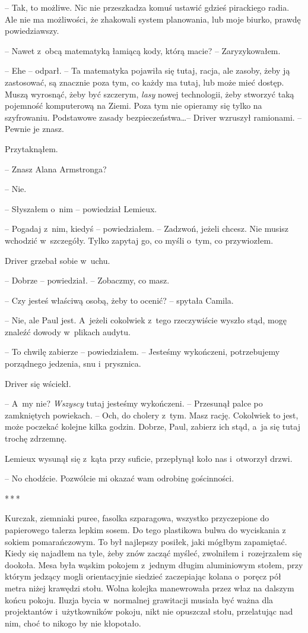 \documentclass[oneside,polish,12pt,sfheadings]{mwbk}
\newcommand{\threeast}{\bigskip\par\centerline{*\,*\,*}\medskip\par}%
\begin{document}
-- Tak, to możliwe. Nic nie przeszkadza
komuś ustawić gdzieś pirackiego radia. Ale nie ma możliwości, że
zhakowali system planowania, lub moje biurko, prawdę powiedziawszy.

-- Nawet z~obcą matematyką łamiącą kody, którą macie? -- Zaryzykowałem.

-- Ehe -- odparł. -- Ta matematyka pojawiła się tutaj, racja, ale zasoby,
żeby ją zastosować, są znacznie poza tym, co każdy ma tutaj, lub może
mieć dostęp. Muszą wyrosnąć, żeby być szczerym, \emph{lasy} nowej
technologii, żeby stworzyć taką pojemność komputerową na Ziemi. Poza tym
nie opieramy się tylko na szyfrowaniu. Podstawowe zasady
bezpieczeństwa\ldots -- Driver wzruszył ramionami. -- Pewnie je znasz.

Przytaknąłem. 

-- Znasz Alana Armstronga?

-- Nie.

-- Słyszałem o~nim -- powiedział Lemieux.

-- Pogadaj z~nim, kiedyś -- powiedziałem. -- Zadzwoń, jeżeli chcesz. Nie
musisz wchodzić w~szczegóły. Tylko zapytaj go, co myśli o~tym, co
przywiozłem.

Driver grzebał sobie w~uchu. 

-- Dobrze -- powiedział. -- Zobaczmy, co masz.

-- Czy jesteś właściwą osobą, żeby to ocenić? -- spytała Camila.

-- Nie, ale Paul jest. A~jeżeli cokolwiek z~tego rzeczywiście wyszło
stąd, mogę znaleźć dowody w~plikach audytu.

-- To chwilę zabierze -- powiedziałem. -- Jesteśmy wykończeni, potrzebujemy
porządnego jedzenia, snu i~prysznica.

Driver się wściekł. 

-- A~my nie? \emph{Wszyscy} tutaj jesteśmy
wykończeni. -- Przesunął palce po zamkniętych powiekach. -- Och, do
cholery z~tym. Masz rację. Cokolwiek to jest, może poczekać kolejne kilka godzin.
Dobrze, Paul, zabierz ich stąd, a~ja się tutaj trochę zdrzemnę.

Lemieux wysunął się z~kąta przy suficie, przepłynął koło nas i~otworzył
drzwi. 

-- No chodźcie. Pozwólcie mi okazać wam odrobinę gościnności.

\threeast

Kurczak, ziemniaki puree, fasolka szparagowa, wszystko przyczepione do
papierowego talerza lepkim sosem. Do tego plastikowa bulwa do wyciskania
z sokiem pomarańczowym. To był najlepszy posiłek, jaki mógłbym
zapamiętać. Kiedy się najadłem na tyle, żeby znów zacząć myśleć,
zwolniłem i~rozejrzałem się dookoła. Mesa była wąskim pokojem z~jednym
długim aluminiowym stołem, przy którym jedzący mogli orientacyjnie
siedzieć zaczepiając kolana o~poręcz pół metra niżej krawędzi stołu.
Wolna kolejka manewrowała przez właz na dalszym końcu pokoju. Iluzja
bycia w~normalnej grawitacji musiała być ważna dla projektantów i~użytkowników pokoju, nikt nie opuszczał stołu, przelatując nad nim, choć
to nikogo by nie kłopotało.
\end{document}
